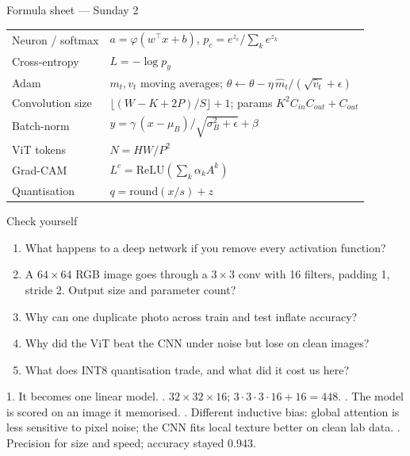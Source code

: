 \documentclass[aspectratio=169,11pt]{beamer}
\begin{document}
\begin{frame}{Formula sheet --- Sunday 2}
\renewcommand{\arraystretch}{1.35}
\begin{tabularx}{\linewidth}{l X}
\toprule
Neuron / softmax & $a=\varphi(w^\top x+b)$, \; $p_c=e^{z_c}/\sum_k e^{z_k}$\\
Cross-entropy & $L=-\log p_y$\\
Adam & $m_t,v_t$ moving averages; $\theta\leftarrow\theta-\eta\,\hat m_t/(\sqrt{\hat v_t}+\epsilon)$\\
Convolution size & $\lfloor (W-K+2P)/S\rfloor+1$; \; params $K^2C_{in}C_{out}+C_{out}$\\
Batch-norm & $y=\gamma\,(x-\mu_B)/\sqrt{\sigma_B^2+\epsilon}+\beta$\\
ViT tokens & $N=HW/P^2$\\
Grad-CAM & $L^c=\mathrm{ReLU}(\sum_k\alpha_kA^k)$\\
Quantisation & $q=\mathrm{round}(x/s)+z$\\
\bottomrule
\end{tabularx}
\end{frame}

\begin{frame}{Check yourself}
\begin{enumerate}
\item What happens to a deep network if you remove every activation function?
\item A $64\times64$ RGB image goes through a $3\times3$ conv with 16 filters, padding 1, stride 2. Output size and parameter count?
\item Why can one duplicate photo across train and test inflate accuracy?
\item Why did the ViT beat the CNN under noise but lose on clean images?
\item What does INT8 quantisation trade, and what did it cost us here?
\end{enumerate}
\begin{bex}[Answers]
1. It becomes one linear model. . $32\times32\times16$; $3\cdot3\cdot3\cdot16+16=448$. . The model is scored on an image it memorised. . Different inductive bias: global attention is less sensitive to pixel noise; the CNN fits local texture better on clean lab data. . Precision for size and speed; accuracy stayed 0.943.
\end{bex}
\end{frame}
\end{document}
